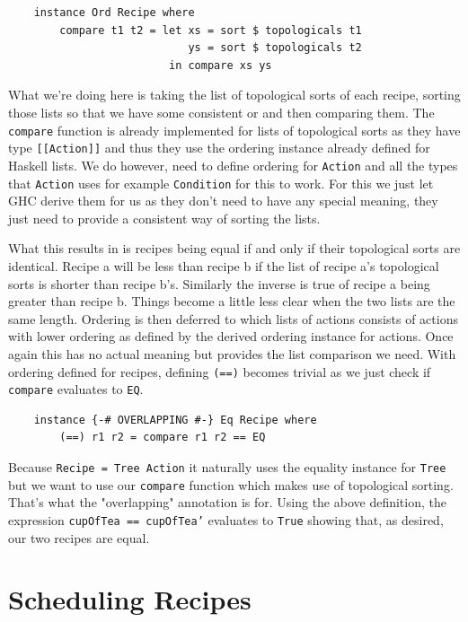 \documentclass[11pt]{article}
\begin{document}
\begin{lstlisting}
    instance Ord Recipe where
        compare t1 t2 = let xs = sort $ topologicals t1
                            ys = sort $ topologicals t2
                         in compare xs ys
\end{lstlisting}

What we're doing here is taking the list of topological sorts of each recipe, sorting those
lists so that we have some consistent or and then comparing them. The \texttt{compare} function
is already implemented for lists of topological sorts as they have type \texttt{[[Action]]}
and thus they use the ordering instance already defined for Haskell lists. We do however,
need to define ordering for \texttt{Action} and all the types that \texttt{Action} uses
for example \texttt{Condition} for this to work. For this we just let GHC derive them for
us as they don't need to have any special meaning, they just need to provide a consistent
way of sorting the lists.

\medbreak

What this results in is recipes being equal if and only if their topological sorts are identical.
Recipe a will be less than recipe b if the list of recipe a's topological sorts is shorter than recipe b's.
Similarly the inverse is true of recipe a being greater than recipe b. Things become a little less
clear when the two lists are the same length. Ordering is then deferred to which lists of actions
consists of actions with lower ordering as defined by the derived ordering instance for actions.
Once again this has no actual meaning but provides the list comparison we need. With ordering defined for recipes,
defining \texttt{(==)} becomes trivial as we just check if \texttt{compare} evaluates to \texttt{EQ}.

\begin{lstlisting}
    instance {-# OVERLAPPING #-} Eq Recipe where
        (==) r1 r2 = compare r1 r2 == EQ
\end{lstlisting}

Because \texttt{Recipe = Tree Action} it naturally uses the equality instance for
\texttt{Tree} but we want to use our \texttt{compare} function which makes use of topological sorting.
That's what the "overlapping" annotation is for. Using the above definition, the expression
\texttt{cupOfTea == cupOfTea'} evaluates to \texttt{True} showing that, as desired, our two recipes are equal.

\section{Scheduling Recipes}
\end{document}
